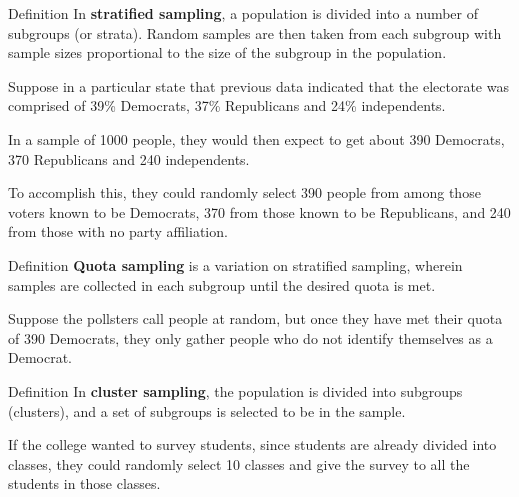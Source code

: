 \documentclass{beamer}
\begin{document}
\begin{frame}
\begin{block}{Definition}
In \textbf{stratified sampling}, a population is divided into a number of subgroups (or strata). Random samples are then taken from each subgroup with sample sizes proportional to the size of the subgroup in the population.
\end{block}\pause

\begin{example}
Suppose in a particular state that previous data indicated that the electorate was comprised of 39\% Democrats, 37\% Republicans and 24\% independents.\pause 

\vspace{2mm}
In a sample of 1000 people, they would then expect to get about 390 Democrats, 370 Republicans and 240 independents.\pause

\vspace{2mm}
To accomplish this, they could randomly select 390 people from among those voters known to be Democrats, 370 from those known to be Republicans, and 240 from those with no party affiliation.
\end{example}
\end{frame}

\begin{frame}
\begin{block}{Definition}
\textbf{Quota sampling} is a variation on stratified sampling, wherein samples are collected in each subgroup until the desired quota is met.
\end{block}\pause

\begin{example}
Suppose the pollsters call people at random, but once they have met their quota of 390 Democrats, they only gather people who do not identify themselves as a Democrat.
\end{example}\pause

\begin{block}{Definition}
In \textbf{cluster sampling}, the population is divided into subgroups (clusters), and a set of subgroups is selected to be in the sample.
\end{block}\pause

\begin{example}
If the college wanted to survey students, since students are already divided into classes, they could randomly select 10 classes and give the survey to all the students in those classes.
\end{example}
\end{frame}
\end{document}
